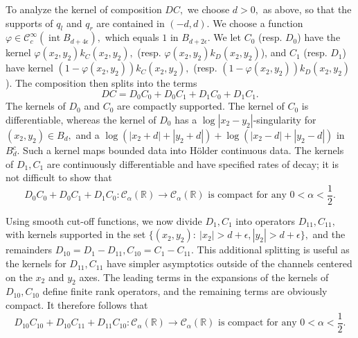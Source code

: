 \documentclass[11pt]{article}
\newcommand\Int{\operatorname{int}}
\newcommand\cC{\mathcal{C}}
\newcommand\bbR{\mathbb R}
\theoremstyle{definition}
\theoremstyle{remark}
\begin{document}
To analyze the kernel of composition $D C,$ we choose $d>0,$ as above, so that the
supports of $q_l$ and $q_r$ are contained in $(-d,d).$ We choose a
function $\varphi\in\cC^{\infty}_c(\Int B_{d+4\epsilon}),$ which equals $1$ in
$B_{d+2\epsilon}.$ We let $C_0$ (resp. $D_0$) have the kernel
$\varphi(x_2,y_2)k_C(x_2,y_2),$ (resp. $\varphi(x_2,y_2)k_D(x_2,y_2)$), and $C_1$ (resp. $D_1$) have kernel
$(1-\varphi(x_2,y_2))k_C(x_2,y_2),$
(resp. $(1-\varphi(x_2,y_2))k_D(x_2,y_2)$). The composition then splits into the
terms
\begin{equation}
  DC=D_0C_0+D_0C_1+D_1C_0+D_1C_1.
\end{equation}
The kernels of $D_0$ and $C_0$ are compactly supported. The kernel of $C_0$ is
differentiable, whereas the kernel of $D_0$ has a $\log|x_2-y_2|$-singularity
for $(x_2,y_2)\in B_d,$ and a $\log(|x_2+d|+|y_2+d|)+\log(|x_2-d|+|y_2-d|)$ in
$B_d^c.$ Such a kernel maps bounded data into H\"older continuous data. The
kernels of $D_1,C_1$ are continuously differentiable and have specified rates of
decay; it is not difficult to show that
\begin{equation}\label{eqn163.57}
  D_0C_0+D_0C_1+D_1C_0:\cC_{\alpha}(\bbR)\to\cC_{\alpha}(\bbR)\text{ is compact
    for any }0<\alpha<\frac 12.
\end{equation}

Using smooth cut-off functions, we now divide $D_1,C_1$ into operators
$D_{11},C_{11},$ with kernels supported in the set
$\{(x_2,y_2):\:|x_2|>d+\epsilon,|y_2|>d+\epsilon\},$ and the remainders
$D_{10}=D_1-D_{11},C_{10}=C_1-C_{11}.$ This additional splitting is useful as
the kernels for $D_{11},C_{11}$ have simpler asymptotics outside of the channels
centered on the $x_2$ and $y_2$ axes. The leading terms in the expansions of the
kernels of $D_{10}, C_{10}$ define finite rank operators, and the remaining terms
are obviously compact. It therefore follows that
\begin{equation}\label{eqn164.57}
  D_{10}C_{10}+D_{10}C_{11}+D_{11}C_{10}:\cC_{\alpha}(\bbR)\to\cC_{\alpha}(\bbR)\text{ is compact
    for any }0<\alpha<\frac 12.
\end{equation}
\end{document}
